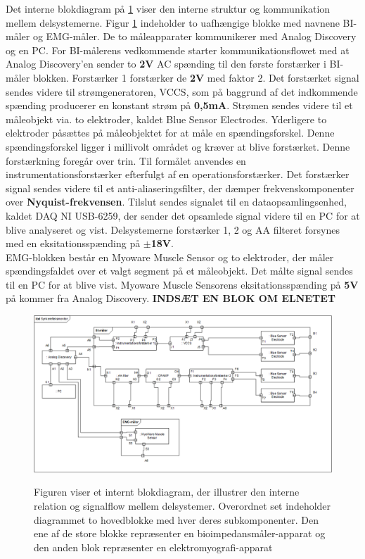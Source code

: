 Det interne blokdiagram på \ref{ibdfigur} viser den interne struktur og kommunikation mellem delsystemerne. Figur \ref{ibdfigur} indeholder to uafhængige blokke med navnene BI-måler og EMG-måler. De to måleapparater kommunikerer med Analog Discovery og en PC. For BI-målerens vedkommende starter kommunikationsflowet med at Analog Discovery'en sender to \textbf{2V} AC spænding til den første forstærker i BI-måler blokken. Forstærker 1 forstærker de \textbf{2V} med faktor 2. Det forstærket signal sendes videre til strømgeneratoren, VCCS, som på baggrund af det indkommende spænding producerer en konstant strøm på \textbf{0,5mA}. Strømen sendes videre til et måleobjekt via. to elektroder, kaldet Blue Sensor Electrodes.       Yderligere to elektroder påsættes på måleobjektet for at måle en spændingsforskel. Denne spændingsforskel ligger i millivolt området og kræver at blive forstærket. Denne forstærkning foregår over trin. Til formålet anvendes en instrumentationsforstærker efterfulgt af en operationsforstærker. Det forstærker signal sendes videre til et anti-aliaseringsfilter, der dæmper frekvenskomponenter over \textbf{Nyquist-frekvensen}. Tilslut sendes signalet til en dataopsamlingsenhed, kaldet DAQ NI USB-6259, der sender det opsamlede signal videre til en PC for at blive analyseret og vist. Delsystemerne forstærker 1, 2 og AA filteret forsynes med en eksitationsspænding på $ \pm  $\textbf{18V}. \\

EMG-blokken består en Myoware Muscle Sensor og to elektroder, der måler spændingsfaldet over et valgt segment på et måleobjekt. Det målte signal sendes til en PC for at blive vist. Myoware Muscle Sensorens eksitationsspænding på \textbf{5V} på  kommer fra Analog Discovery.   
					\textbf{INDSÆT EN BLOK OM ELNETET} 
\begin{figure}[H]
\centering
{\includegraphics[width=\linewidth]
{Figure/IBD2}}
\caption{Figuren viser et internt blokdiagram, der illustrer den interne relation og signalflow mellem delsystemer. Overordnet set indeholder diagrammet to hovedblokke med hver deres subkomponenter. Den ene af de store blokke repræsenter en bioimpedansmåler-apparat og den anden blok repræsenter en elektromyografi-apparat }
\label{ibdfigur}
\end{figure}

